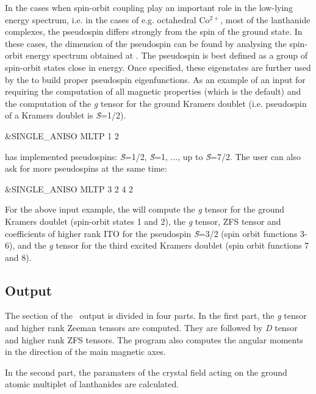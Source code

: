 In the cases when spin-orbit coupling play an important role in the low-lying energy spectrum, i.e. in the cases of e.g. octahedral Co$^{2+}$,
 most of the lanthanide complexes, the pseudospin differs strongly from the spin of the ground state. In these cases, 
the dimension of the pseudospin can be found by analysing the spin-orbit energy spectrum obtained at . 
The pseudospin is best defined as a group of spin-orbit states close in energy. Once specified, these eigenstates are further used
by the  to build proper pseudospin eigenfunctions. As an example of an input for  
requiring the computation of all magnetic properties (which is the default) and the computation of the {\it g} tensor for the ground 
Kramers doublet (i.e. pseudospin of a Kramers doublet is \textit{\~{S}}=1/2).

\begin{inputlisting}
 &SINGLE_ANISO
  MLTP
  1
  2
\end{inputlisting}

 has implemented pseudospins: \textit{\~{S}}=1/2, \textit{\~{S}}=1, ..., up to \textit{\~{S}}=7/2. The user can also ask for more pseudospins at the same time:

\begin{inputlisting}
 &SINGLE_ANISO
  MLTP
  3
  2 4 2
\end{inputlisting}
For the above input example, the  will compute the {\it g} tensor for the ground Kramers doublet
(spin-orbit states 1 and 2), the {\it g} tensor, ZFS tensor and coefficients of higher rank ITO for the pseudospin  
\textit{\~{S}}=3/2 (spin orbit functions 3-6), and the  {\it g} tensor for the third excited Kramers doublet (spin orbit functions 7 and 8).

\subsection{ Output}


The  section of the \molcas\ output is divided in four parts. In the first part, the \textit{g} tensor and higher rank Zeeman tensors are computed. They are followed by \textit{D} tensor and higher rank ZFS tensors. The program also computes the angular moments in the direction of the main magnetic axes.

In the second part, the paramaters of the crystal field acting on the ground atomic multiplet of lanthanides are calculated.

